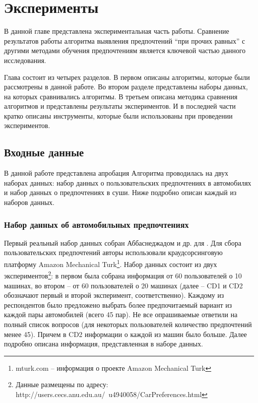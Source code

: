 \chapter{Эксперименты}
\label{chapter:experiments}
В данной главе представлена экспериментальная часть работы. Сравнение результатов работы алгоритма выявления предпочтений \enquote{при прочих равных} с другими методами обучения предпочтениям является ключевой частью данного исследования.

Глава состоит из четырех разделов. В первом описаны алгоритмы, которые были рассмотрены в данной работе. Во втором разделе представлены наборы данных, на которых сравнивались алгоритмы. В третьем описана методика сравнения алгоритмов и представлены результаты экспериментов. И в последней части кратко описаны инструменты, которые были использованы при проведении экспериментов.

\section{Входные данные}
	В данной работе представлена
	апробация Алгоритма проводилась на двух наборах данных: набор данных о пользовательских предпочтениях в автомобилях и набор данных о предпочтениях в суши. Ниже подробно описан каждый из наборов данных.
	
	
	\subsection{Набор данных об автомобильных предпочтениях}
	\label{subsec:cars_description}
		Первый реальный набор данных собран Аббаснеджадом и др. для \cite{dataset:Abbasnejad:2013}. Для сбора пользовательских предпочтений авторы использовали краудсорсинговую платформу Amazon Mechanical Turk\footnote{mturk.com – информация о проекте Amazon Mechanical Turk}. Набор данных состоит из двух экспериментов\footnote{Данные размещены по адресу: http://users.cecs.anu.edu.au/~u4940058/CarPreferences.html}: в первом была собрана информация от 60 пользователей о 10 машинах, во втором – от 60 пользователей о 20 машинах (далее – CD1 и CD2 обозначают первый и второй эксперимент, соответственно). Каждому из респондентов было предложено выбрать более предпочитаемый вариант из каждой пары автомобилей (всего 45 пар). Не все опрашиваемые ответили на полный список вопросов (для некоторых пользователей количество предпочтений менее 45). Причем в CD2 информации о каждой из машин было больше. Далее подробно описана информация, представленная в наборе данных.
		
